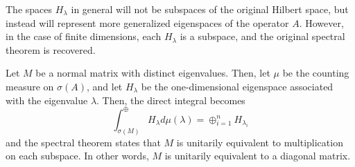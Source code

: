 The spaces $H_{\lambda}$ in general will not be subspaces of the original
Hilbert space, but instead will represent more generalized eigenspaces of the
operator $A$. However, in the case of finite dimensions, each $H_{\lambda}$ is a
subspace, and the original spectral theorem is recovered.

\begin{example}
    Let $M$ be a normal matrix with distinct eigenvalues. Then, let $\mu$ be the
    counting measure on $\sigma(A)$, and let $H_{\lambda}$ be the
    one-dimensional eigenspace associated with the eigenvalue $\lambda$. Then,
    the direct integral becomes
    \[
        \int_{\sigma(M)}^{\oplus}H_\lambda d\mu(\lambda) = \oplus_{i=1}^n
        H_{\lambda_i}
        \]
    and the spectral theorem states that $M$ is unitarily equivalent to
    multiplication on each subspace. In other words, $M$ is unitarily equivalent
    to a diagonal matrix.
\end{example}
